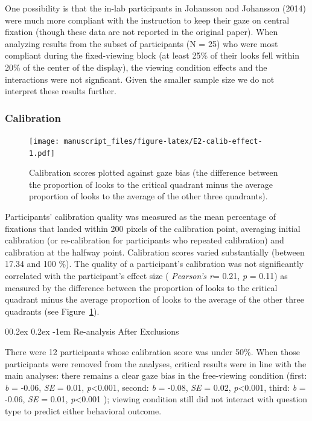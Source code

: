 \documentclass[
  man,floatsintext]{apa6}
\makeatletter
\let\oldparagraph\paragraph
\renewcommand{\paragraph}[1]{\oldparagraph{#1}\mbox{}}
\renewcommand{\paragraph}{\@startsection{paragraph}{4}{\parindent}%
  {0\baselineskip \@plus 0.2ex \@minus 0.2ex}%
  {-1em}%
  {\normalfont\normalsize\bfseries\itshape\typesectitle}}
\makeatother
\begin{document}
One possibility is that the in-lab participants in Johansson and Johansson (2014) were much more compliant with the instruction to keep their gaze on central fixation (though these data are not reported in the original paper). When analyzing results from the subset of participants (N = 25) who were most compliant during the fixed-viewing block (at least 25\% of their looks fell within 20\% of the center of the display), the viewing condition effects and the interactions were not signficant. Given the smaller sample size we do not interpret these results further.

\subsubsection{Calibration}\label{calibration-2}

\begin{figure}
\centering
\texttt{[image: manuscript\_files/figure-latex/E2-calib-effect-1.pdf]}
\caption{\label{fig:E2-calib-effect}Calibration scores plotted against gaze bias (the difference between the proportion of looks to the critical quadrant minus the average proportion of looks to the average of the other three quadrants).}
\end{figure}

Participants' calibration quality was measured as the mean percentage of fixations that landed within 200 pixels of the calibration point, averaging initial calibration (or re-calibration for participants who repeated calibration) and calibration at the halfway point. Calibration scores varied substantially (between 17.34 and 100 \%).
The quality of a participant's calibration was not significantly correlated with the participant's effect size ( \emph{Pearson's r}= 0.21, \emph{p} = 0.11) as measured by the difference between the proportion of looks to the critical quadrant minus the average proportion of looks to the average of the other three quadrants (see Figure~\ref{fig:E2-calib-effect}).

\paragraph{Re-analysis After Exclusions}\label{re-analysis-after-exclusions-2}

There were 12 participants whose calibration score was under 50\%. When those participants were removed from the analyses, critical results were in line with the main analyses: there remains a clear gaze bias in the free-viewing condition (first: \emph{b} = -0.06, \emph{SE} = 0.01, \emph{p}\textless0.001, second: \emph{b} = -0.08, \emph{SE} = 0.02, \emph{p}\textless0.001, third: \emph{b} = -0.06, \emph{SE} = 0.01, \emph{p}\textless0.001 ); viewing condition still did not interact with question type to predict either behavioral outcome.
\end{document}
